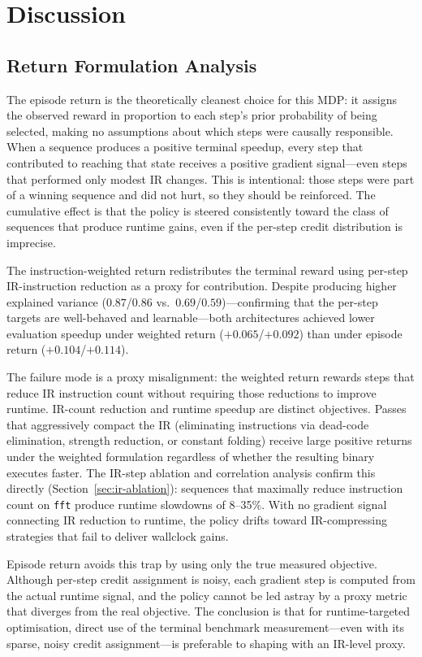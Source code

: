 \documentclass[conference]{IEEEtran}
\begin{document}
\section{Discussion}

\subsection{Return Formulation Analysis}
The episode return is the theoretically cleanest choice for this MDP:
it assigns the observed reward in proportion to each step's prior probability
of being selected, making no assumptions about which steps were causally
responsible.
When a sequence produces a positive terminal speedup, every step that
contributed to reaching that state receives a positive gradient signal---even
steps that performed only modest IR changes.
This is intentional: those steps were part of a winning sequence and did not
hurt, so they should be reinforced.
The cumulative effect is that the policy is steered consistently toward the
class of sequences that produce runtime gains, even if the per-step credit
distribution is imprecise.

The instruction-weighted return redistributes the terminal reward using
per-step IR-instruction reduction as a proxy for contribution.
Despite producing higher explained variance ($0.87$/$0.86$ vs.\
$0.69$/$0.59$)---confirming that the per-step targets are well-behaved and
learnable---both architectures achieved lower evaluation speedup under
weighted return ($+0.065$/$+0.092$) than under episode return
($+0.104$/$+0.114$).

The failure mode is a proxy misalignment: the weighted return rewards steps
that reduce IR instruction count without requiring those reductions to improve
runtime.
IR-count reduction and runtime speedup are distinct objectives.
Passes that aggressively compact the IR (eliminating instructions via
dead-code elimination, strength reduction, or constant folding) receive large
positive returns under the weighted formulation regardless of whether the
resulting binary executes faster.
The IR-step ablation and correlation analysis confirm this directly
(Section~\ref{sec:ir-ablation}): sequences that maximally reduce instruction
count on \texttt{fft} produce runtime slowdowns of 8--35\%.
With no gradient signal connecting IR reduction to runtime, the policy
drifts toward IR-compressing strategies that fail to deliver wallclock gains.

Episode return avoids this trap by using only the true measured objective.
Although per-step credit assignment is noisy, each gradient step is computed
from the actual runtime signal, and the policy cannot be led astray by a
proxy metric that diverges from the real objective.
The conclusion is that for runtime-targeted optimisation, direct use of the
terminal benchmark measurement---even with its sparse, noisy credit
assignment---is preferable to shaping with an IR-level proxy.
\end{document}
